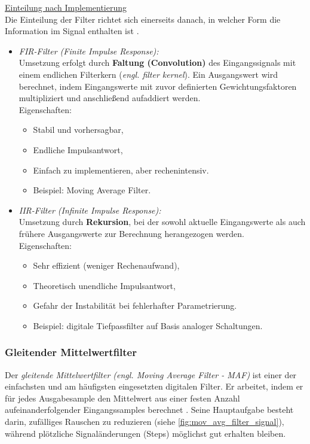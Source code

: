 \documentclass[a4paper, portrait, 12pt]{scrartcl} %
\begin{document}
\pagebreak

\underline{Einteilung nach Implementierung}\\
Die Einteilung der Filter richtet sich einerseits danach, in welcher Form die Information im Signal enthalten ist \cite[S. 265]{Smith1999}.

\begin{itemize}
	\item \emph{FIR-Filter (Finite Impulse Response):}\\
	Umsetzung erfolgt durch \textbf{Faltung (Convolution)} des Eingangssignals mit einem endlichen Filterkern (\emph{engl. filter kernel}). Ein Ausgangswert wird berechnet, indem Eingangswerte mit zuvor definierten Gewichtungsfaktoren multipliziert und anschließend aufaddiert werden.\\
	Eigenschaften:
	\begin{itemize}
		\item Stabil und vorhersagbar,
		\item Endliche Impulsantwort,
		\item Einfach zu implementieren, aber rechenintensiv.
		\item Beispiel: Moving Average Filter.
	\end{itemize}

	\item \emph{IIR-Filter (Infinite Impulse Response):}\\
	Umsetzung durch \textbf{Rekursion}, bei der sowohl aktuelle Eingangswerte als auch frühere Ausgangswerte zur Berechnung herangezogen werden.\\
	Eigenschaften:
	\begin{itemize}
		\item Sehr effizient (weniger Rechenaufwand),
		\item Theoretisch unendliche Impulsantwort,
		\item Gefahr der Instabilität bei fehlerhafter Parametrierung.
		\item Beispiel: digitale Tiefpassfilter auf Basis analoger Schaltungen.	
	\end{itemize}
\end{itemize}

\pagebreak

\subsubsection{Gleitender Mittelwertfilter}

Der \emph{gleitende Mittelwertfilter (engl. Moving Average Filter - MAF)} ist einer der einfachsten und am häufigsten eingesetzten digitalen Filter. Er arbeitet, indem er für jedes Ausgabesample den Mittelwert aus einer festen Anzahl aufeinanderfolgender Eingangssamples berechnet \cite[S. 277]{Smith1999}.
Seine Hauptaufgabe besteht darin, zufälliges Rauschen zu reduzieren (siehe \autoref{fig:mov_avg_filter_signal}), während plötzliche Signaländerungen (Steps) möglichst gut erhalten bleiben.
\end{document}
